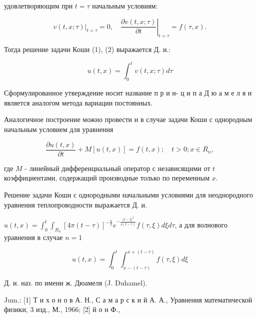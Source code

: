 \documentclass[10pt]{article}
\begin{document}
удовлетворяющим при $t=\tau$ начальным условиям:



\[

\left.v(t, x ; \tau)\right|_{t=\tau}=0,\left.\quad \frac{\partial v(t, x ; \tau)}{\partial t}\right|_{t=\tau}=f(\tau, x) .

\]



Тогда решение задачи Коши (1), (2) выражается Д. и.:



\[

u(t, x)=\int_{0}^{t} v(t, x ; \tau) d \tau

\]



Сформулированное утверждение носит название п р и н- ц и п а Д ю а м е л я и является аналогом метода вариации постоянных.



Аналогичное построение можно провести и в случае задачи Коши с однородным начальным условием для уравнения



\[

\frac{\partial u(t, x)}{\partial t}+M[u(t, x)]=f(t, x) ; \quad t>0 ; x \in R_{n},

\]



где $M$ - линейный дифференциальный оператор с независящими от $t$ коэффициентами, содержащий производные только по переменным $x$.



Решение задачи Коши с однородными начальными условиями для неоднородного уравнения теплопроводности выражается Д. и.



$u(t, x)=\int_{0}^{t} \int_{R_{n}}[4 \pi(t-\tau)]^{-\frac{n}{2}} e^{-\frac{|x-\xi|^{2}}{4(t-\tau)}} f(\tau, \xi) d \xi d \tau$, а для волнового уравнения в случае $n=1$



\[

u(t, x)=\int_{0}^{t} \int_{x-(t-\tau)}^{x+(t-\tau)} f(\tau, \xi) d \xi

\]



Д. и. наз. по имени ж. Дюамеля (J. Duhamel).



Jum.: [1] Т и х о н о в А. Н., С а м а р с к и й А. А., Уравнения математической физики, 3 изд., М., 1966; [2] й о н Ф.,
\end{document}
